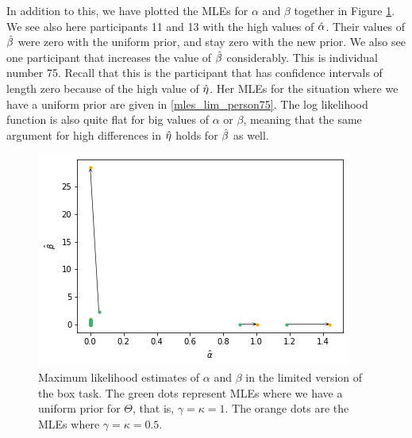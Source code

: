 In addition to this, we have plotted the MLEs for $\alpha$ and $\beta$ together in Figure \ref{fig:sensitivity_mles_lim_a_b}. We see also here participants 11 and 13 with the high values of $\hat{\alpha}$. Their values of $\hat{\beta}$ were zero with the uniform prior, and stay zero with the new prior. We also see one participant that increases the value of $\hat{\beta}$ considerably. This is individual number 75. Recall that this is the participant that has confidence intervals of length zero because of the high value of $\hat{\eta}$. Her MLEs for the situation where we have a uniform prior are given in \eqref{mles_lim_person75}. The log likelihood function is also quite flat for big values of $\alpha$ or $\beta$, meaning that the same argument for high differences in $\hat{\eta}$ holds for $\hat{\beta}$ as well.  
\begin{figure}
    \centering
    \includegraphics[scale=0.8]{pictures/Sensitivity/mles_lim_a_b.png}
    \caption[MLEs of $\alpha$ and $\beta$ for prior with $\gamma=\kappa=1$ and $\gamma=\kappa=0.5$, limited]{
    Maximum likelihood estimates of $\alpha$ and $\beta$ in the limited version of the box task. The green dots represent MLEs where we have a uniform prior for $\Theta$, that is, $\gamma=\kappa=1$. The orange dots are the MLEs where $\gamma=\kappa=0.5$.}
    \label{fig:sensitivity_mles_lim_a_b}
\end{figure}

